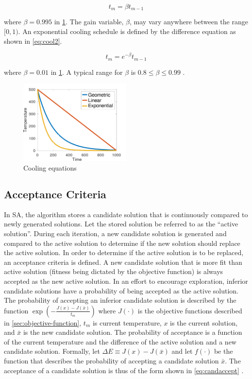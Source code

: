 \documentclass[11pt,a4paper,final]{article}
\begin{document}
\begin{equation}
\label{eq:cool1}
t_m = \beta t_{m-1}
\end{equation}

where \(\beta = 0.995\) in \ref{fig:cool}. The gain variable, \(\beta\), may vary anywhere between the range \([0,1)\). An exponential
cooling schedule is defined by the difference equation as shown in \ref{eq:cool2}.

\begin{equation}
\label{eq:cool2}
t_m = e^{-\beta}t_{m-1}
\end{equation}

where \(\beta = 0.01\) in \ref{fig:cool}. A typical range for \(\beta\) is \(0.8 \le \beta \le 0.99\) \cite{delahaye-2019-simul}.

\begin{figure}[htbp]
\centering
\includegraphics[width=0.5\textwidth]{sections/img/cool_func.png}
\caption{\label{fig:cool}Cooling equations}
\end{figure}

\subsection{Acceptance Criteria}
\label{sec:acceptance}
In SA, the algorithm stores a candidate solution that is continuously compared to newly generated solutions. Let the
stored solution be referred to as the ``active solution''. During each iteration, a new candidate solution is generated
and compared to the active solution to determine if the new solution should replace the active solution. In order to
determine if the active solution is to be replaced, an acceptance criteria is defined. A new candidate solution that is
more fit than active solution (fitness being dictated by the objective function) is always accepted as the new active
solution. In an effort to encourage exploration, inferior candidate solutions have a probability of being accepted as
the active solution. The probability of accepting an inferior candidate solution is described by the function
\(\exp(-\frac{J(x) - J(\bar{x})}{t_m})\) where \(J(\cdot)\) is the objective functions described in \ref{sec:objective-function},
\(t_m\) is current temperature, \(x\) is the current solution, and \(\bar{x}\) is the new candidate solution. The probability
of acceptance is a function of the current temperature and the difference of the active solution and a new candidate
solution. Formally, let \(\Delta E \equiv J(x) - J(\bar{x})\) and let \(f(\cdot)\) be the function that describes the probability of
accepting a candidate solution \(\bar{x}\). The acceptance of a candidate solution is thus of the form shown in
\ref{eq:candaccept} \cite{keller-2019-multi-objec}.
\end{document}
